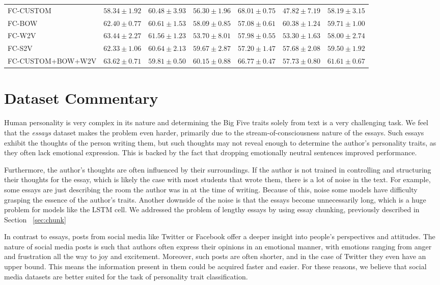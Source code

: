 \documentclass[10pt, a4paper]{article}
\begin{document}
\begin{table*}
\begin{center}
{\begin{tabular}{l|ccccc|c}
FC-CUSTOM & $58.34 \pm 1.92$ & $60.48 \pm 3.93$ & $56.30 \pm 1.96$ & $68.01 \pm 0.75$ & $47.82 \pm 7.19$ & $58.19 \pm 3.15$ \\
FC-BOW & $62.40 \pm 0.77$ & $60.61 \pm 1.53$ & $58.09 \pm 0.85$ & $57.08 \pm 0.61$ & $60.38 \pm 1.24$ & $59.71 \pm 1.00$ \\
FC-W2V & $63.44 \pm 2.27$ & $61.56 \pm 1.23$ & $53.70 \pm 8.01$ & $57.98 \pm 0.55$ & $53.30 \pm 1.63$ & $58.00 \pm 2.74$ \\
FC-S2V & $62.33 \pm 1.06$ & $60.64 \pm 2.13$ & $59.67 \pm 2.87$ & $57.20 \pm 1.47$ & $57.68 \pm 2.08$ & $59.50 \pm 1.92$ \\
FC-CUSTOM+BOW+W2V & $63.62 \pm 0.71$ & $59.81 \pm 0.50$ & $60.15 \pm 0.88$ & $66.77 \pm 0.47$ & $57.73 \pm 0.80$ & $61.61 \pm 0.67$ \\
\bottomrule
\end{tabular}}
\end{center}
\end{table*}

\section{Dataset Commentary}
Human personality is very complex in its nature and determining the Big Five traits solely from text is a very challenging task. We feel that the \textit{essays} dataset makes the problem even harder, primarily due to the stream-of-consciousness nature of the essays. Such essays exhibit the thoughts of the person writing them, but such thoughts may not reveal enough to determine the author's personality traits, as they often lack emotional expression. This is backed by the fact that dropping emotionally neutral sentences improved performance.

Furthermore, the author's thoughts are often influenced by their surroundings. If the author is not trained in controlling and structuring their thoughts for the essay, which is likely the case with most students that wrote them, there is a lot of noise in the text. For example, some essays are just describing the room the author was in at the time of writing. Because of this, noise some models have difficulty grasping the essence of the author's traits. Another downside of the noise is that the essays become unnecessarily long, which is a huge problem for models like the LSTM cell. We addressed the problem of lengthy essays by using essay chunking, previously described in Section ~\ref{sec:chunk} 

In contrast to essays, posts from social media like Twitter or Facebook offer a deeper insight into people's perspectives and attitudes. The nature of social media posts is such that authors often express their opinions in an emotional manner, with emotions ranging from anger and frustration all the way to joy and excitement. Moreover, such posts are often shorter, and in the case of Twitter they even have an upper bound. This means the information present in them could be acquired faster and easier. For these reasons, we believe that social media datasets are better suited for the task of personality trait classification.
\end{document}
